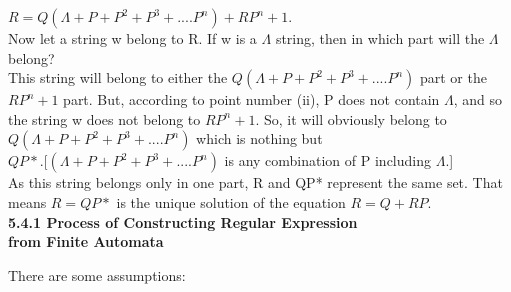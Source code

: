\documentclass[9pt]{article}
\begin{document}
\vspace*{0.1cm}
\hspace*{3cm} $R = Q(\Lambda + P + P^2 + P^3 + .... P^n) + RP^n + 1.$ \\

\vspace*{0.1cm}
\hspace*{0.5cm} Now let a string w belong to R. If w is a $\Lambda$ string, then in which part will the $\Lambda$ belong?\\


\hspace*{0.5cm} This string will belong to either the $Q(\Lambda + P + P^2 + P^3 + .... P^n)$ part or the $RP^n + 1$ part. But, according
to point number (ii), P does not contain $\Lambda$, and so the string w does not belong to $RP^n + 1$. So, it will
obviously belong to $Q(\Lambda + P + P^2 + P^3 + .... P^n)$ which is nothing but $QP*. [(\Lambda + P + P^2 + P^3 + .... P^n)$ is
any combination of P including $\Lambda$.]\\

\hspace*{0.5cm} As this string belongs only in one part, R and QP* represent the same set. That means $R = QP*$ is the
unique solution of the equation $R = Q + RP.$\\

\vspace*{0.5cm}
\large{
\textbf{5.4.1 Process of Constructing Regular Expression\\
\hspace*{0.7cm} from Finite Automata}\\
}

\vspace*{0.2cm}

There are some assumptions:\\
\end{document}
